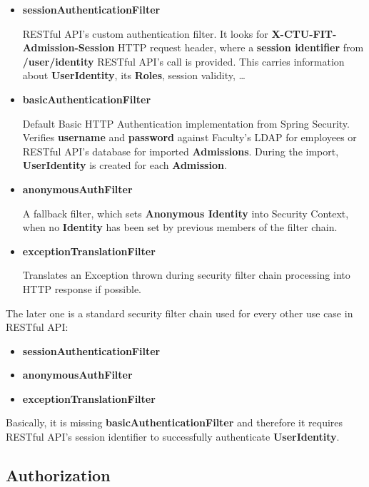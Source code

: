 	\begin{itemize}
		\item\label{itm:sessionAuthenticationFilter} \textbf{sessionAuthenticationFilter}

		RESTful API's custom authentication filter. It looks for \textbf{X-CTU-FIT-Admission-Session} HTTP request header,
		where a \textbf{session identifier} from \textbf{/user/identity} RESTful API's call is provided. This carries
		information about \textbf{UserIdentity}, its \textbf{Roles}, session validity, \ldots 
		\item \textbf{basicAuthenticationFilter}
		
		Default Basic HTTP Authentication implementation from Spring Security. Verifies \textbf{username} and
		\textbf{password} against Faculty's \gls{LDAP} for employees or RESTful API's database for imported
		\textbf{Admissions}. During the import, \textbf{UserIdentity} is created for each \textbf{Admission}.
		\item\label{itm:anonymousAuthFilter} \textbf{anonymousAuthFilter}
		
		A fallback filter, which sets \textbf{Anonymous Identity} into Security Context, when no \textbf{Identity} has been
		set by previous members of the filter chain.
		\item\label{itm:exceptionTranslationFilter} \textbf{exceptionTranslationFilter}
		
		Translates an Exception thrown during security filter chain processing into HTTP response if possible. 
	\end{itemize}
	
	The later one is a standard security filter chain used for every other use case in RESTful API:
	
	\begin{itemize}
		\item \textbf{sessionAuthenticationFilter}
		\item \textbf{anonymousAuthFilter}
		\item \textbf{exceptionTranslationFilter}
	\end{itemize}
	
	Basically, it is missing \textbf{basicAuthenticationFilter} and therefore it requires RESTful API's session identifier
	to successfully authenticate \textbf{UserIdentity}.
	
	\subsection{Authorization}
	
